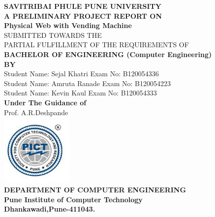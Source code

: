 \documentclass[oneside,a4paper,12pt]{report}
\begin{document}
\setlength{\parindent}{0mm}
\begin{center}
{\bfseries SAVITRIBAI PHULE PUNE UNIVERSITY \\}
 \vspace*{1\baselineskip}
{\bfseries A PRELIMINARY PROJECT REPORT ON \\}
 \vspace*{2\baselineskip}
{\bfseries \fontsize{16}{12} \selectfont Physical Web with Vending Machine \\ \vspace*{2\baselineskip}}
{\fontsize{12}{12} \selectfont SUBMITTED TOWARDS THE
 \\PARTIAL FULFILLMENT OF THE REQUIREMENTS OF \\

\vspace*{2\baselineskip}}
{\bfseries \fontsize{14}{12} \selectfont BACHELOR OF ENGINEERING (Computer
Engineering) \\
\vspace*{1\baselineskip}} 
{\bfseries \fontsize{14}{12} \selectfont BY \\ 
\vspace*{1\baselineskip}} 
Student Name: Sejal Khatri \hspace{25 mm} Exam No: B120054336\\
Student Name: Amruta Ranade \hspace{25 mm} Exam No:  B120054223  \\
Student Name: Kevin Kaul\hspace{25 mm} Exam No: B120054333  \\
\vspace*{2\baselineskip}
{\bfseries \fontsize{14}{12} \selectfont Under The Guidance of \\  
\vspace*{2\baselineskip}} 
Prof. A.R.Deshpande\\
\includegraphics[width=100pt]{collegelogo.png} \\
{\bfseries \fontsize{14}{12} \selectfont DEPARTMENT OF COMPUTER ENGINEERING \\
Pune Institute of Computer Technology \\
Dhankawadi,Pune-411043.
}
\end{center}
\end{document}
